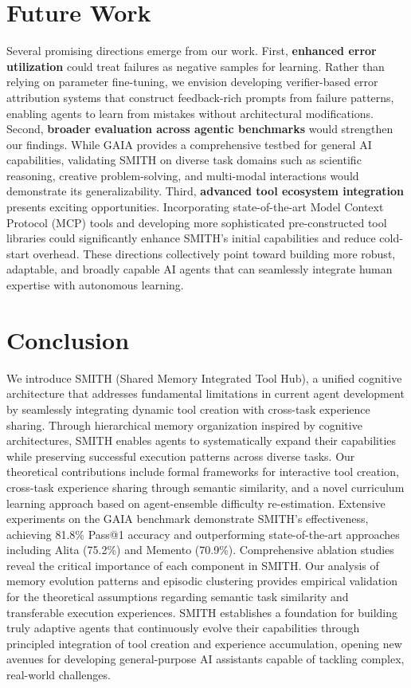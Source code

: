 \documentclass{article} %
\begin{document}
\section{Future Work}

Several promising directions emerge from our work. First, \textbf{enhanced error utilization} could treat failures as negative samples for learning. Rather than relying on parameter fine-tuning, we envision developing verifier-based error attribution systems that construct feedback-rich prompts from failure patterns, enabling agents to learn from mistakes without architectural modifications. Second, \textbf{broader evaluation across agentic benchmarks} would strengthen our findings. While GAIA provides a comprehensive testbed for general AI capabilities, validating SMITH on diverse task domains such as scientific reasoning, creative problem-solving, and multi-modal interactions would demonstrate its generalizability. Third, \textbf{advanced tool ecosystem integration} presents exciting opportunities. Incorporating state-of-the-art Model Context Protocol (MCP) tools and developing more sophisticated pre-constructed tool libraries could significantly enhance SMITH's initial capabilities and reduce cold-start overhead. These directions collectively point toward building more robust, adaptable, and broadly capable AI agents that can seamlessly integrate human expertise with autonomous learning.


\section{Conclusion}

We introduce SMITH (Shared Memory Integrated Tool Hub), a unified cognitive architecture that addresses fundamental limitations in current agent development by seamlessly integrating dynamic tool creation with cross-task experience sharing. Through hierarchical memory organization inspired by cognitive architectures, SMITH enables agents to systematically expand their capabilities while preserving successful execution patterns across diverse tasks. Our theoretical contributions include formal frameworks for interactive tool creation, cross-task experience sharing through semantic similarity, and a novel curriculum learning approach based on agent-ensemble difficulty re-estimation. Extensive experiments on the GAIA benchmark demonstrate SMITH's effectiveness, achieving 81.8\% Pass@1 accuracy and outperforming state-of-the-art approaches including Alita (75.2\%) and Memento (70.9\%). Comprehensive ablation studies reveal the critical importance of each component in SMITH. Our analysis of memory evolution patterns and episodic clustering provides empirical validation for the theoretical assumptions regarding semantic task similarity and transferable execution experiences. SMITH establishes a foundation for building truly adaptive agents that continuously evolve their capabilities through principled integration of tool creation and experience accumulation, opening new avenues for developing general-purpose AI assistants capable of tackling complex, real-world challenges.
\end{document}
